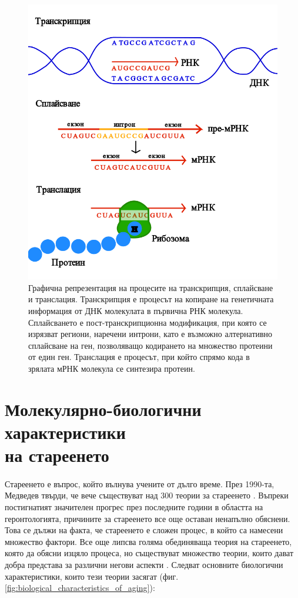 \documentclass[pdftex,cyrillic,14pt,a4page,twoside,openright]{extreport}
\begin{document}
\begin{figure}[htp]
  \centering
  \includegraphics[width=12cm]{figures/transcription_splicing_translation}
  \caption {Графична репрезентация на процесите на транскрипция, сплайсване и транслация. Транскрипция е процесът на копиране на генетичната информация от ДНК молекулата в първична РНК молекула. Сплайсването е пост-транскрипционна модификация, при която се изрязват региони, наречени интрони, като е възможно алтернативно сплайсване на ген, позволяващо кодирането на множество протеини от един ген. Транслация е процесът, при който спрямо кода в зрялата мРНК молекула се синтезира протеин.}
  \label{fig:transcription_splicing_translation}
\end{figure}

\section[Молекулярно-биологични характеристики на стареенето]{Молекулярно-биологични характеристики\\ на стареенето}
\paragraph{}
Стареенето е въпрос, който вълнува учените от дълго време. През 1990-та, Медведев твърди, че вече съществуват над 300 теории за стареенето \cite{medvedev1990}. Въпреки постигнатият значителен прогрес през последните години в областта на геронтологията, причините за стареенето все още оставан ненапълно обяснени. Това се дължи на факта, че стареенето е сложен процес, в който са намесени множество фактори. Все още липсва голяма обединяваща теория на стареенето, която да обясни изцяло процеса, но съществуват множество теории, които дават добра представа за различни негови аспекти \cite{vina2007}. Следват основните биологични характеристики, които тези теории засягат (фиг. \ref{fig:biological_characteristics_of_aging}):
\end{document}
